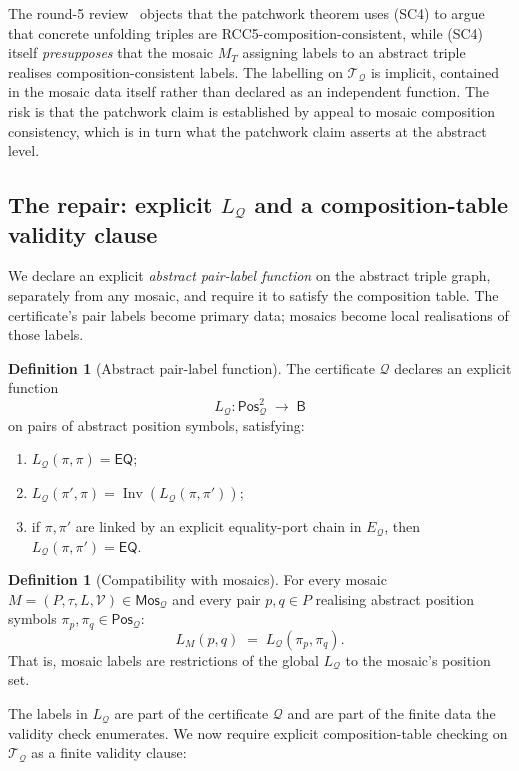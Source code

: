\documentclass[11pt]{article}
\theoremstyle{definition}
\newtheorem{definition}[theorem]{Definition}
\theoremstyle{remark}
\newcommand{\EQ}{\mathsf{EQ}}
\newcommand{\Base}{\mathsf{B}}
\newcommand{\Inv}{\operatorname{Inv}}
\newcommand{\Mos}{\mathsf{Mos}}
\newcommand{\Pos}{\mathsf{Pos}}
\newcommand{\Q}{\mathcal{Q}}
\newcommand{\T}{\mathcal{T}}
\begin{document}
The round-5 review~\cite{GPT55Round5Review} objects that the
patchwork theorem uses (SC4) to argue that concrete unfolding
triples are RCC5-composition-consistent, while (SC4) itself
\emph{presupposes} that the mosaic $M_T$ assigning labels to an
abstract triple realises composition-consistent labels.  The
labelling on $\T_\Q$ is implicit, contained in the mosaic data
itself rather than declared as an independent function.  The risk
is that the patchwork claim is established by appeal to mosaic
composition consistency, which is in turn what the patchwork claim
asserts at the abstract level.

\subsection{The repair: explicit $L_\Q$ and a composition-table validity clause}

We declare an explicit \emph{abstract pair-label function} on the
abstract triple graph, separately from any mosaic, and require it
to satisfy the composition table.  The certificate's pair labels
become primary data; mosaics become local realisations of those
labels.

\begin{definition}[Abstract pair-label function]\label{def:Lq}
The certificate $\Q$ declares an explicit function
\[
  L_\Q:\Pos_\Q^2\;\longrightarrow\;\Base
\]
on pairs of abstract position symbols, satisfying:
\begin{enumerate}[label=(L\arabic*)]
\item $L_\Q(\pi,\pi)=\EQ$;
\item $L_\Q(\pi',\pi)=\Inv(L_\Q(\pi,\pi'))$;
\item if $\pi,\pi'$ are linked by an explicit equality-port chain in
$E_\Q$, then $L_\Q(\pi,\pi')=\EQ$.
\end{enumerate}
\end{definition}

\begin{definition}[Compatibility with mosaics]\label{def:LM-Lq}
For every mosaic $M=(P,\tau,L,\mathcal V)\in\Mos_\Q$ and every pair
$p,q\in P$ realising abstract position symbols
$\pi_p,\pi_q\in\Pos_\Q$:
\[
  L_M(p,q)\;=\;L_\Q(\pi_p,\pi_q).
\]
That is, mosaic labels are restrictions of the global $L_\Q$ to the
mosaic's position set.
\end{definition}

The labels in $L_\Q$ are part of the certificate $\Q$ and are part
of the finite data the validity check enumerates.  We now require
explicit composition-table checking on $\T_\Q$ as a finite
validity clause:
\end{document}
